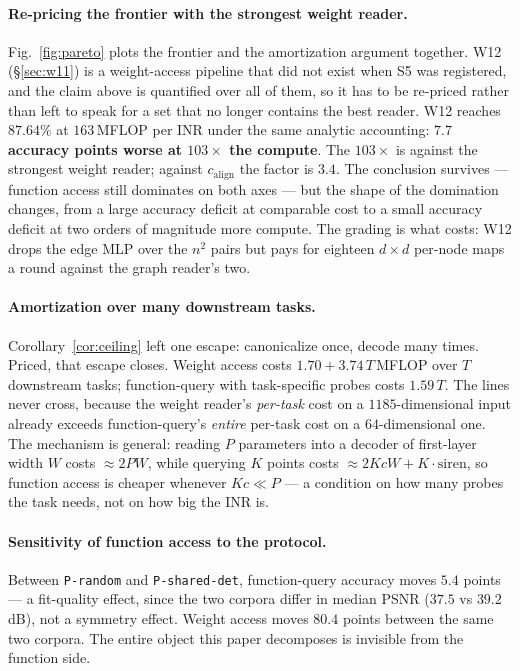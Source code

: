 \documentclass[10pt,twocolumn,letterpaper]{article}
\theoremstyle{definition}
\newcommand{\calign}{c_{\mathrm{align}}}
\begin{document}
\paragraph{Re-pricing the frontier with the strongest weight reader.}
Fig.~\ref{fig:pareto} plots the frontier and the amortization argument together. W12
(\S\ref{sec:w11}) is a weight-access pipeline that did not exist when S5 was registered, and the
claim above is quantified over all of them, so it has to be re-priced rather than left to speak for
a set that no longer contains the best reader. W12 reaches $87.64\%$ at $163$\,MFLOP per INR under
the same analytic accounting: \textbf{$7.7$ accuracy points worse at $103\times$ the compute}. The
$103\times$ is against the strongest weight reader; against $\calign$ the factor is $3.4$. The
conclusion survives --- function access still dominates on both axes --- but the shape of the
domination changes, from a large accuracy deficit at comparable cost to a small accuracy deficit at
two orders of magnitude more compute. The grading is what costs: W12 drops the edge MLP over the
$n^2$ pairs but pays for eighteen $d\times d$ per-node maps a round against the graph reader's two.

\paragraph{Amortization over many downstream tasks.} Corollary~\ref{cor:ceiling} left one escape: canonicalize
once, decode many times. Priced, that escape closes. Weight access costs
$1.70 + 3.74\,T$\,MFLOP over $T$ downstream tasks; function-query with task-specific probes costs
$1.59\,T$. The lines never cross, because the weight reader's \emph{per-task} cost on a $1185$-dimensional
input already exceeds function-query's \emph{entire} per-task cost on a $64$-dimensional one. The
mechanism is general: reading $P$ parameters into a decoder of first-layer width $W$ costs
$\approx 2PW$, while querying $K$ points costs $\approx 2KcW + K\cdot\mathrm{siren}$, so function
access is cheaper whenever $Kc \ll P$ --- a condition on how many probes the task needs, not on how
big the INR is.

\paragraph{Sensitivity of function access to the protocol.} Between \texttt{P-random} and
\texttt{P-shared-det}, function-query accuracy moves $5.4$ points --- a fit-quality effect, since the
two corpora differ in median PSNR ($37.5$ vs $39.2$\,dB), not a symmetry effect. Weight access moves
$\mathbf{80.4}$ points between the same two corpora. The entire object this paper decomposes is
invisible from the function side.
\end{document}
